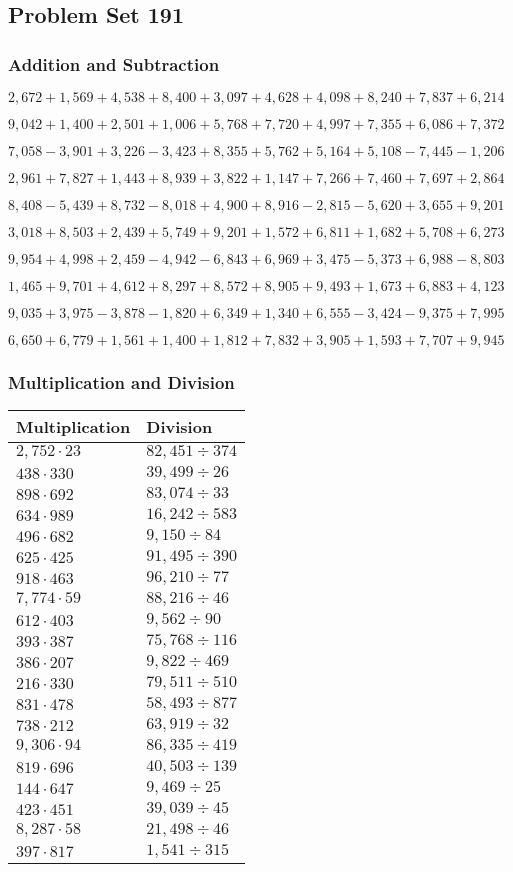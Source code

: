 \hypertarget{problem-set-191}{%
\subsection{Problem Set 191}\label{problem-set-191}}

\hypertarget{addition-and-subtraction}{%
\subsubsection{Addition and
Subtraction}\label{addition-and-subtraction}}

\(2,672+1,569+4,538+8,400+3,097+4,628+4,098+8,240+7,837+6,214\)

\(9,042+1,400+2,501+1,006+5,768+7,720+4,997+7,355+6,086+7,372\)

\(7,058-3,901+3,226-3,423+8,355+5,762+5,164+5,108-7,445-1,206\)

\(2,961+7,827+1,443+8,939+3,822+1,147+7,266+7,460+7,697+2,864\)

\(8,408-5,439+8,732-8,018+4,900+8,916-2,815-5,620+3,655+9,201\)

\(3,018+8,503+2,439+5,749+9,201+1,572+6,811+1,682+5,708+6,273\)

\(9,954+4,998+2,459-4,942-6,843+6,969+3,475-5,373+6,988-8,803\)

\(1,465+9,701+4,612+8,297+8,572+8,905+9,493+1,673+6,883+4,123\)

\(9,035+3,975-3,878-1,820+6,349+1,340+6,555-3,424-9,375+7,995\)

\(6,650+6,779+1,561+1,400+1,812+7,832+3,905+1,593+7,707+9,945\)

\hypertarget{multiplication-and-division}{%
\subsubsection{Multiplication and
Division}\label{multiplication-and-division}}

\begin{longtable}[]{@{}ll@{}}
\toprule
Multiplication & Division\tabularnewline
\midrule
\endhead
\(2,752\cdot23\) & \(82,451÷374\)\tabularnewline
\(438\cdot330\) & \(39,499÷26\)\tabularnewline
\(898\cdot692\) & \(83,074÷33\)\tabularnewline
\(634\cdot989\) & \(16,242÷583\)\tabularnewline
\(496\cdot682\) & \(9,150÷84\)\tabularnewline
\(625\cdot425\) & \(91,495÷390\)\tabularnewline
\(918\cdot463\) & \(96,210÷77\)\tabularnewline
\(7,774\cdot59\) & \(88,216÷46\)\tabularnewline
\(612\cdot403\) & \(9,562÷90\)\tabularnewline
\(393\cdot387\) & \(75,768÷116\)\tabularnewline
\(386\cdot207\) & \(9,822÷469\)\tabularnewline
\(216\cdot330\) & \(79,511÷510\)\tabularnewline
\(831\cdot478\) & \(58,493÷877\)\tabularnewline
\(738\cdot212\) & \(63,919÷32\)\tabularnewline
\(9,306\cdot94\) & \(86,335÷419\)\tabularnewline
\(819\cdot696\) & \(40,503÷139\)\tabularnewline
\(144\cdot647\) & \(9,469÷25\)\tabularnewline
\(423\cdot451\) & \(39,039÷45\)\tabularnewline
\(8,287\cdot58\) & \(21,498÷46\)\tabularnewline
\(397\cdot817\) & \(1,541÷315\)\tabularnewline
\bottomrule
\end{longtable}
